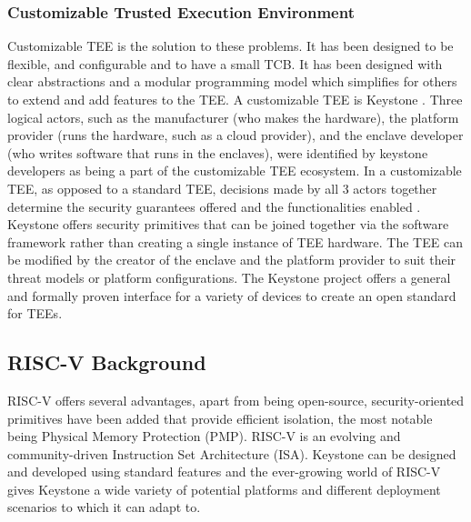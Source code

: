 \subsubsection{Customizable Trusted Execution Environment}
Customizable TEE is the solution to these problems. It has been designed to be flexible, and configurable and to have a small TCB. It has been designed with clear abstractions and a modular programming model which simplifies for others to extend and add features to the TEE. A customizable TEE is Keystone \cite{lee2020keystone}. Three logical actors, such as the manufacturer (who makes the hardware), the platform provider (runs the hardware, such as a cloud provider), and the enclave developer (who writes software that runs in the enclaves), were identified by keystone developers as being a part of the customizable TEE ecosystem. In a customizable TEE, as opposed to a standard TEE, decisions made by all 3 actors together determine the security guarantees offered and the functionalities enabled \cite{keysyone-blog-1}. 
Keystone offers security primitives that can be joined together via the software framework rather than creating a single instance of TEE hardware. The TEE can be modified by the creator of the enclave and the platform provider to suit their threat models or platform configurations. The Keystone project offers a general and formally proven interface for a variety of devices to create an open standard for TEEs. 

\subsection{RISC-V Background}
RISC-V offers several advantages, apart from being open-source, security-oriented primitives have been added that provide efficient isolation, the most notable being Physical Memory Protection (PMP). RISC-V is an evolving and community-driven Instruction Set Architecture (ISA). Keystone can be designed and developed using standard features and the ever-growing world of RISC-V gives Keystone a wide variety of potential platforms and different deployment scenarios to which it can adapt to. \cite{keysyone-blog-2}

